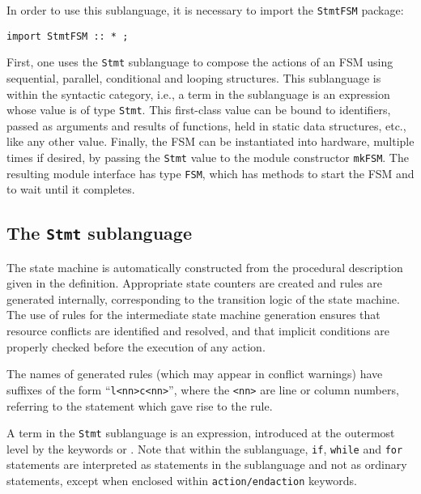 

In order to use this sublanguage, it is necessary to import the
\texttt{StmtFSM} package:

\begin{verbatim}
import StmtFSM :: * ;
\end{verbatim}

First, one uses the \texttt{Stmt} sublanguage to compose the actions
of an FSM using sequential, parallel, conditional and looping
structures.  This sublanguage is within the 
syntactic category, i.e., a term in the sublanguage is an expression
whose value is of type {\tt Stmt}. This first-class value can be bound
to identifiers, passed as arguments and results of functions, held in
static data structures, etc., like any other value.  Finally, the FSM
can be instantiated into hardware, multiple times if desired, by
passing the \texttt{Stmt} value to the module
constructor \texttt{mkFSM}.  The resulting module interface has
type \texttt{FSM}, which has methods to start the FSM and to wait
until it completes.


\subsection{The \texttt{Stmt} sublanguage}

\label{sec-stmtsublang}

The state machine is automatically constructed from the procedural
description given in the  definition.  Appropriate state
counters are created  and rules are generated internally, 
corresponding to the transition logic of the state machine.  The use of rules
for the intermediate state machine generation
ensures that resource conflicts are identified and resolved, and
that implicit conditions are properly checked before the execution
of any action.

The names of generated rules (which may appear in conflict warnings) have
suffixes of the form ``\verb|l<nn>c<nn>|'', where the \verb|<nn>| are line
or column numbers, referring to the statement which gave rise to the rule.


A term in the \texttt{Stmt} sublanguage is an expression, introduced at
the outermost level by the keywords  or .  Note
that within the sublanguage, \texttt{if}, \texttt{while} and \texttt{for}
statements are interpreted as statements in the sublanguage and not as
ordinary statements, except when enclosed within 
\texttt{action/endaction} keywords.  
 
